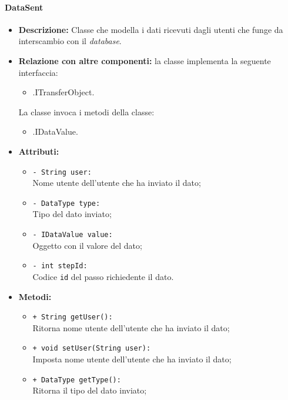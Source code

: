 \paragraph{DataSent}
\label{botdatasent}
\begin{flushleft}
\begin{itemize}
\item \textbf{Descrizione:} Classe che modella i dati ricevuti dagli utenti che funge da interscambio  con il \textit{database}.
\item \textbf{Relazione con altre componenti:} la classe implementa la seguente interfaccia:
		\begin{itemize}
			\item \smodel{}.ITransferObject.
		\end{itemize}
				La classe invoca i metodi della classe:
		\begin{itemize}
			\item \smodel{}.IDataValue.
		\end{itemize}
\item \textbf{Attributi:}
\begin{sloppypar}
\begin{itemize}
\item \texttt{- String user:}\\ Nome utente dell'utente che ha inviato il dato;
\item \texttt{- DataType type:}\\ Tipo del dato inviato;
\item \texttt{- IDataValue value:}\\ Oggetto con il valore del dato;
\item \texttt{- int stepId:}\\Codice \texttt{id} del passo richiedente il dato.
\end{itemize}
\end{sloppypar}
\item \textbf{Metodi:}
\begin{sloppypar}
\begin{itemize}
\item \texttt{+ String getUser():}\\ Ritorna nome utente dell'utente che ha inviato il dato;
\item \texttt{+ void setUser(String user):}\\ Imposta nome utente dell'utente che ha inviato il dato;
\item \texttt{+ DataType getType():}\\ Ritorna il tipo del dato inviato;

\end{itemize}
\end{sloppypar}
\end{itemize}
\end{flushleft}
